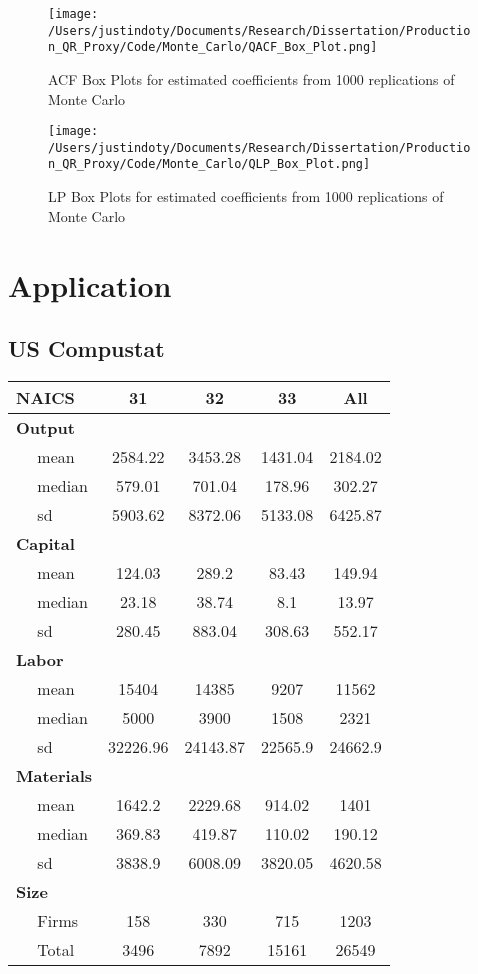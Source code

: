 \documentclass[11pt]{article}
\begin{document}
\begin{figure}[H]
\centering
\caption{ACF Box Plots for estimated coefficients from 1000 replications of Monte Carlo}
\texttt{[image: /Users/justindoty/Documents/Research/Dissertation/Production\_QR\_Proxy/Code/Monte\_Carlo/QACF\_Box\_Plot.png]}
\label{ACF_Box Plot}
\end{figure}

\begin{figure}[H]
\centering
\caption{LP Box Plots for estimated coefficients from 1000 replications of Monte Carlo}
\texttt{[image: /Users/justindoty/Documents/Research/Dissertation/Production\_QR\_Proxy/Code/Monte\_Carlo/QLP\_Box\_Plot.png]}
\label{LP_Box Plot}
\end{figure}

\section{Application}
\subsection{US Compustat}
\begin{table}[H]
\centering
\begin{tabular}{l|c|c|c|c}
NAICS & 31 & 32 & 33 & All\\
\hline
\bf{Output} & ~ & ~ & ~ & ~\\
\hline
~~ mean & 2584.22 & 3453.28 & 1431.04 & 2184.02\\
\hline
~~ median & 579.01 & 701.04 & 178.96 & 302.27\\
\hline
~~ sd & 5903.62 & 8372.06 & 5133.08 & 6425.87\\
\hline
\bf{Capital} & ~ & ~ & ~ & ~\\
\hline
~~ mean & 124.03 & 289.2 & 83.43 & 149.94\\
\hline
~~ median & 23.18 & 38.74 & 8.1 & 13.97\\
\hline
~~ sd & 280.45 & 883.04 & 308.63 & 552.17\\
\hline
\bf{Labor} & ~ & ~ & ~ & ~\\
\hline
~~ mean & 15404 & 14385 & 9207 & 11562\\
\hline
~~ median & 5000 & 3900 & 1508 & 2321\\
\hline
~~ sd & 32226.96 & 24143.87 & 22565.9 & 24662.9\\
\hline
\bf{Materials} & ~ & ~ & ~ & ~\\
\hline
~~ mean & 1642.2 & 2229.68 & 914.02 & 1401\\
\hline
~~ median & 369.83 & 419.87 & 110.02 & 190.12\\
\hline
~~ sd & 3838.9 & 6008.09 & 3820.05 & 4620.58\\
\hline
\bf{Size} & ~ & ~ & ~ & ~\\
\hline
~~ Firms & 158 & 330 & 715 & 1203\\
\hline
~~ Total & 3496 & 7892 & 15161 & 26549\\
\hline
\end{tabular}
\end{table}
\normalsize
\end{document}
